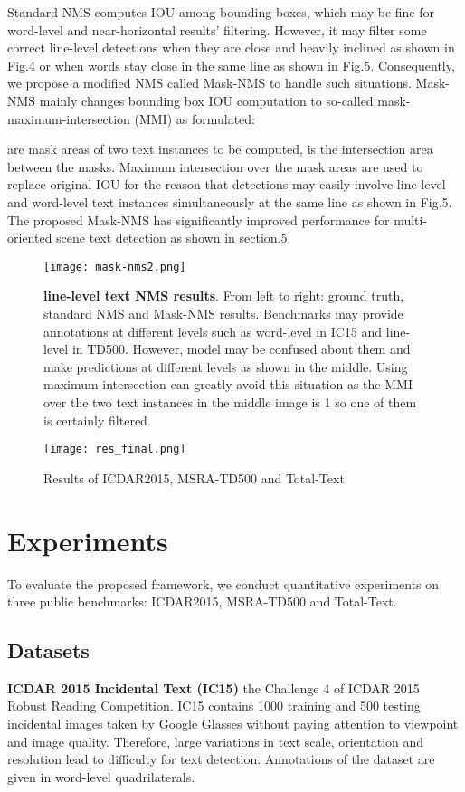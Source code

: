 \documentclass[a4paper,conference]{IEEEtran}
\begin{document}
Standard NMS computes IOU among bounding boxes, which may be fine for word-level and near-horizontal  results' filtering. However, it may filter some correct line-level detections when they are close and heavily inclined as shown in Fig.4 or when words stay close in the same line as shown in Fig.5. Consequently, we propose a modified NMS called Mask-NMS to handle such situations. Mask-NMS mainly changes bounding box IOU computation to so-called mask-maximum-intersection (MMI) as formulated:

 are mask areas of two text instances to be computed,   is the intersection area between the masks. Maximum intersection over the mask areas are used to replace original IOU for the reason that detections may easily involve line-level and word-level text instances simultaneously at the same line as shown in Fig.5. 
The proposed Mask-NMS has significantly improved performance for multi-oriented scene text detection as shown in section.5. 
\begin{figure}[h]
\begin{center}
  
\texttt{[image: mask-nms2.png]}
\caption{\textbf{line-level text NMS results}. From left to right: ground truth, standard NMS  and Mask-NMS results. Benchmarks may provide annotations at different levels such as word-level in IC15 and line-level in TD500. However, model may be confused about them and make predictions at different levels as shown in the middle. Using maximum intersection can greatly avoid this situation as the MMI over the two text instances in the middle image is 1 so one of them is certainly filtered.} 

\end{center}
\end{figure}
\begin{figure*}
\begin{center}
  
\texttt{[image: res\_final.png]}
\caption{Results of ICDAR2015, MSRA-TD500 and Total-Text} 

\end{center}
\end{figure*} 
\section{Experiments}
To evaluate the proposed framework, we conduct quantitative experiments
on three public benchmarks: ICDAR2015, MSRA-TD500 and Total-Text.
\subsection{Datasets}
\textbf{ICDAR 2015 Incidental Text (IC15)} the Challenge 4 of ICDAR 2015 Robust
Reading Competition\cite{Karatzas2015ICDAR}. IC15 contains 1000 training and 500 testing incidental images taken by Google Glasses without paying attention to viewpoint and image quality. Therefore, large variations in text scale, orientation and resolution lead to difficulty for text detection. Annotations of the dataset are given in word-level
quadrilaterals.
\end{document}
